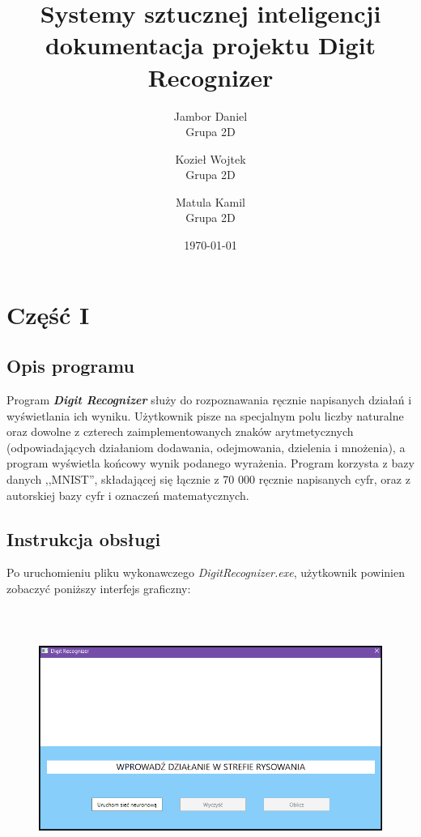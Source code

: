 \documentclass[12pt,a4paper]{article}
\begin{document}
	
	\title{Systemy sztucznej inteligencji\\\small{dokumentacja projektu Digit Recognizer}}
	\author{
	Jambor Daniel\\
	Grupa 2D
	\and
	Kozieł Wojtek\\
	Grupa 2D
	\and
	Matula Kamil\\
	Grupa 2D}

	\date{\today}

	\maketitle
	\newpage
	
\section*{Część I}
\subsection*{Opis programu}
\hspace{20pt}Program \textit{\textbf{Digit Recognizer}} służy do rozpoznawania ręcznie napisanych działań i wyświetlania ich wyniku. Użytkownik pisze na specjalnym polu liczby naturalne oraz dowolne z czterech zaimplementowanych znaków arytmetycznych (odpowiadających działaniom dodawania, odejmowania, dzielenia i mnożenia), a program wyświetla końcowy wynik podanego wyrażenia. Program korzysta z bazy danych ,,MNIST'', składającej się łącznie z 70 000 ręcznie napisanych cyfr, oraz z autorskiej bazy cyfr i oznaczeń matematycznych.	
\vspace{10pt}	
\subsection*{Instrukcja obsługi}
\hspace{20pt}Po uruchomieniu pliku wykonawczego \textit{DigitRecognizer.exe}, użytkownik powinien zobaczyć poniższy interfejs graficzny:

	\begin{figure}[h!]
	\centering
	\includegraphics[height=8.5cm]{graphics/app.png}
	\end{figure}
\end{document}
